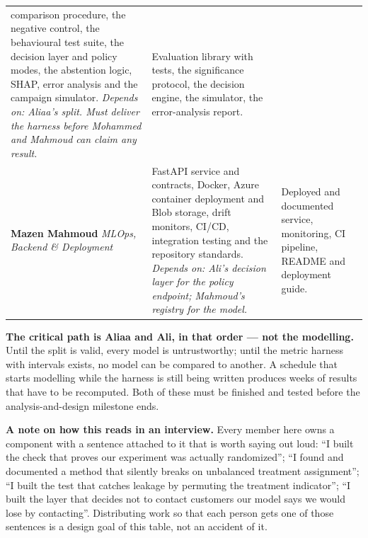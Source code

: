 \documentclass[11pt,a4paper]{article}
\begin{document}
\begin{longtable}{@{}L{3.1cm}L{6.0cm}L{5.0cm}@{}}
comparison procedure, the negative control, the behavioural test suite, the decision layer and
policy modes, the abstention logic, SHAP, error analysis and the campaign simulator.
\newline \emph{Depends on: Aliaa's split. Must deliver the harness before Mohammed and Mahmoud
can claim any result.} &
Evaluation library with tests, the significance protocol, the decision engine, the simulator,
the error-analysis report. \\
\addlinespace
\textbf{Mazen Mahmoud} \newline \emph{MLOps, Backend \& Deployment} &
FastAPI service and contracts, Docker, Azure container deployment and Blob storage, drift
monitors, CI/CD, integration testing and the repository standards.
\newline \emph{Depends on: Ali's decision layer for the policy endpoint; Mahmoud's registry
for the model.} &
Deployed and documented service, monitoring, CI pipeline, README and deployment guide. \\
\bottomrule
\end{longtable}

\begin{alertbox}
\textbf{The critical path is Aliaa and Ali, in that order --- not the modelling.} Until the split
is valid, every model is untrustworthy; until the metric harness with intervals exists, no model can
be compared to another. A schedule that starts modelling while the harness is still being written
produces weeks of results that have to be recomputed. Both of these must be finished
and tested before the analysis-and-design milestone ends.
\end{alertbox}

\begin{keybox}
\textbf{A note on how this reads in an interview.} Every member here owns a component with a
sentence attached to it that is worth saying out loud: ``I built the check that proves our
experiment was actually randomized''; ``I found and documented a method that silently breaks on
unbalanced treatment assignment''; ``I built the test that catches leakage by permuting the
treatment indicator''; ``I built the layer that decides not to contact customers our model says we
would lose by contacting''. Distributing work so that each person gets one of those sentences is a
design goal of this table, not an accident of it.
\end{keybox}
\end{document}
